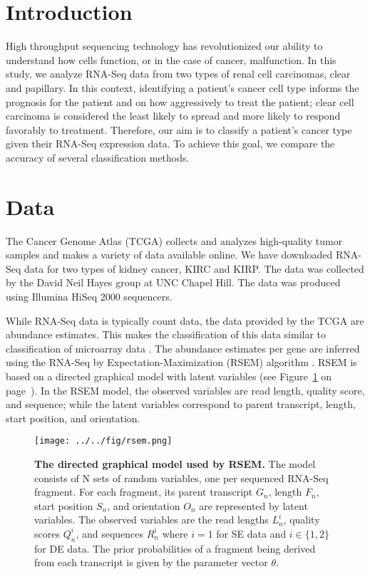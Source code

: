 \section{Introduction}

High throughput sequencing technology has revolutionized our ability to
understand how cells function, or in the case of cancer, malfunction. In this
study, we analyze RNA-Seq data from two types of renal cell carcinomas, clear
and papillary.  In this context, identifying a patient's cancer cell type
informs the prognosis for the patient and on how aggressively to treat the
patient; clear cell carcinoma is considered the least likely to spread and more
likely to respond favorably to treatment. Therefore, our aim is to classify a
patient's cancer type given their RNA-Seq expression data. To achieve this
goal, we compare the accuracy of several classification methods.

\section{Data}

The Cancer Genome Atlas (TCGA) collects and analyzes high-quality tumor samples
and makes a variety of data available online. We have downloaded RNA-Seq data
for two types of kidney cancer, KIRC and KIRP. The data was collected by the
David Neil Hayes group at UNC Chapel Hill. The data was produced using Illumina
HiSeq 2000 sequencers. 

While RNA-Seq data is typically count data, the data provided by the TCGA are
abundance estimates.  This makes the classification of this data similar to
classification of microarray data \cite{dudoitclass}.  The abundance estimates
per gene are inferred using the RNA-Seq by Expectation-Maximization (RSEM)
algorithm \cite{li2011rsem}.  RSEM is based on a directed graphical model with
latent variables (see Figure~\ref{fig:rsem} on page~\pageref{fig:rsem}). In the
RSEM model, the observed variables are read length, quality score, and
sequence; while the latent variables correspond to parent transcript, length,
start position, and orientation.

\begin{figure}[H]
  \centering
    \texttt{[image: ../../fig/rsem.png]}
\caption{\textbf{The directed graphical model used by RSEM.} The model consists of N
sets of random variables, one per sequenced RNA-Seq fragment. For each fragment,
its parent transcript $G_n$, length $F_n$, start position  $S_n$, and orientation $O_n$
are represented by latent variables. The observed variables are the read lengths
$L_n^i$, quality scores $Q_n^i$, and sequences $R_n^i$ where $i = 1$ for SE data and
$i \in \{1,2\}$ for DE data. The prior probabilities of a
fragment being derived from each transcript is given by the parameter vector $\theta$.}
   \label{fig:rsem}
\end{figure}

